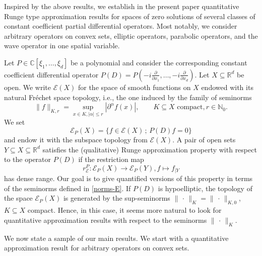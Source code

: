 \documentclass[12pt]{amsart}
\newcommand{\N}{\mathbb{N}}
\newcommand{\R}{\mathbb{R}}
\newcommand{\C}{\mathbb{C}}
\theoremstyle{definition}
\theoremstyle{remark}
\numberwithin{equation}{section}
\begin{document}
Inspired by the above results, we establish in the present paper quantitative Runge type approximation results for  spaces of zero solutions of several classes of constant coefficient partial differential operators. Most notably, we consider arbitrary operators on convex sets, elliptic operators, parabolic operators, and the wave operator in one spatial variable. 

Let $P\in\C[\xi_1,\ldots,\xi_d]$ be a polynomial and consider the corresponding constant coefficient differential operator $P(D)=P(-i\frac{\partial}{\partial x_1},\ldots,-i\frac{\partial}{\partial x_d})$. Let $X \subseteq \R^d$ be open. We write $\mathcal{E}(X)$ for the space of smooth functions on $X$ endowed with its natural Fr\'echet space topology, i.e., the one induced by the family of seminorms
\begin{equation}
\label{norms-E}
\|f\|_{K,r}=\sup_{x\in K,|\alpha|\leq r}|\partial^\alpha f(x)|, \qquad K \subseteq X \mbox{ compact}, r \in \N_0.
\end{equation}
We set 
$$\mathscr{E}_P(X) = \{f\in\mathscr{E}(X)\,;\, P(D)f=0\}$$ 
and endow it with the subspace topology from $\mathscr{E}(X)$. A pair of open sets $Y\subseteq X \subseteq \R^d$ satisfies the (qualitative) Runge  approximation property with respect to the operator $P(D)$  if the restriction map
$$r^P_{\mathscr{E}}:\mathscr{E}_P(X)\rightarrow\mathscr{E}_P(Y), f\mapsto f_{|Y}$$
has dense range. Our goal is to give quantified versions of this property in terms of the seminorms defined in \eqref{norms-E}. If $P(D)$ is hypoelliptic, the topology of the space $\mathscr{E}_P(X)$ is generated by the sup-seminorms $ \|\, \cdot \, \|_{K} =  \|\, \cdot \, \|_{K,0}$, $K \subseteq X$ compact. Hence, in this case, it seems more  natural to look for quantitative approximation results with respect to the seminorms $ \|\, \cdot \, \|_{K}$. 

We now state a sample of our main results.  We start with a quantitative approximation result for arbitrary operators on convex sets.
\end{document}
